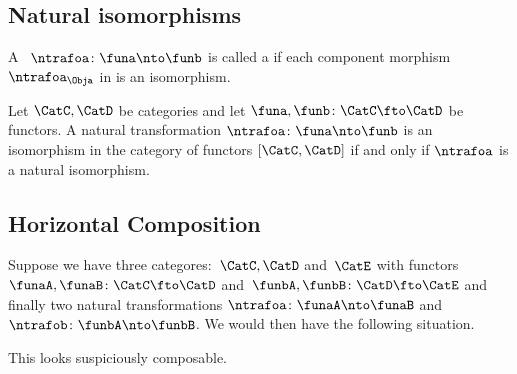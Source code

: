 \subsection{Natural isomorphisms}

\begin{ctdefinition}
    \label{def:natural-isomorphism}
    A ~$\ntrafoa \colon \funa \nto \funb $ is called a  if each component morphism ~$\ntrafoa_\Obja$ in \CatD is an isomorphism.
\end{ctdefinition}

\begin{lemma}
    Let $\CatC, \CatD$ be categories and let $\funa, \funb \colon \CatC \fto \CatD$ be functors.
    A natural transformation $\ntrafoa \colon \funa \nto \funb $ is an isomorphism in the category of functors $[\CatC, \CatD]$ if and only if $\ntrafoa$ is a natural isomorphism.
\end{lemma}

\subsection{Horizontal Composition}

Suppose we have three categores:~$\CatC, \CatD$ and~$\CatE$ with functors~$\funaA,\funaB\colon\CatC \fto \CatD$ and~$\funbA,\funbB\colon \CatD \fto \CatE$ and finally two natural transformations
$\ntrafoa\colon \funaA \nto \funaB$ and~$\ntrafob\colon \funbA \nto \funbB$.
We would then have the following situation.


This looks suspiciously composable.

